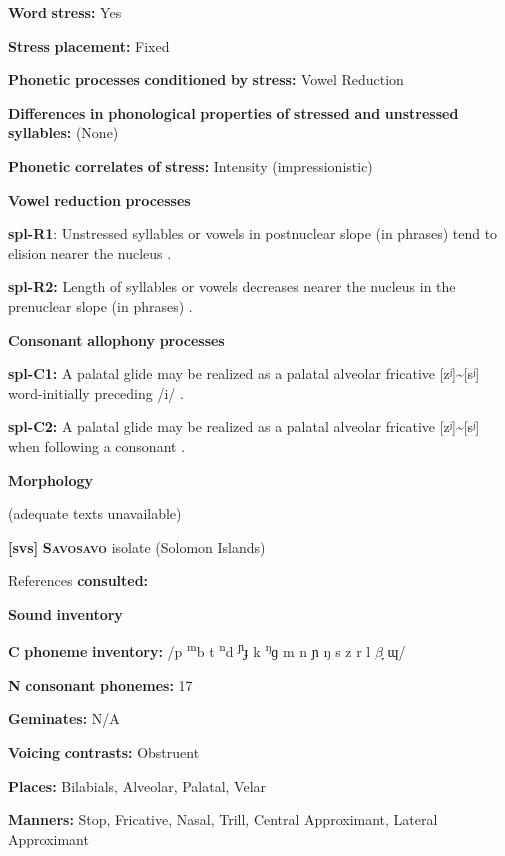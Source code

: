 \textbf{Word} \textbf{stress:} Yes

\textbf{Stress} \textbf{placement:} Fixed

\textbf{Phonetic} \textbf{processes} \textbf{conditioned} \textbf{by} \textbf{stress:} Vowel Reduction

\textbf{Differences} \textbf{in} \textbf{phonological} \textbf{properties} \textbf{of} \textbf{stressed} \textbf{and} \textbf{unstressed} \textbf{syllables:} (None)

\textbf{Phonetic} \textbf{correlates} \textbf{of} \textbf{stress:} Intensity (impressionistic)

\textbf{Vowel} \textbf{reduction} \textbf{processes}

\textbf{spl-R1}: Unstressed syllables or vowels in postnuclear slope (in phrases) tend to elision nearer the nucleus \citep[6]{McElhanon1970}.

\textbf{spl-R2:} Length of syllables or vowels decreases nearer the nucleus in the prenuclear slope (in phrases) \citep[6]{McElhanon1970}.

\textbf{Consonant} \textbf{allophony} \textbf{processes}

\textbf{spl-C1:} A palatal glide may be realized as a palatal alveolar fricative [zʲ]{\textasciitilde}[sʲ] word-initially preceding /i/ \citep{McElhanon1970}.

\textbf{spl-C2:} A palatal glide may be realized as a palatal alveolar fricative [zʲ]{\textasciitilde}[sʲ] when following a consonant \citep{McElhanon1970}.

\textbf{Morphology}

(adequate texts unavailable)

\textbf{[svs]}   \textbf{\textsc{Savosavo}}  isolate (Solomon Islands)

References \textbf{consulted:} \citet{Wegener2008}

\textbf{Sound} \textbf{inventory}

\textbf{C} \textbf{phoneme} \textbf{inventory:} /p \textsuperscript{m}b t \textsuperscript{n}d \textsuperscript{ɲ}ɟ k \textsuperscript{ŋ}ɡ m n ɲ ŋ s z r l $\beta ̞$ ɰ/

\textbf{N} \textbf{consonant} \textbf{phonemes:} 17

\textbf{Geminates:} N/A

\textbf{Voicing} \textbf{contrasts:} Obstruent

\textbf{Places:} Bilabials, Alveolar, Palatal, Velar

\textbf{Manners:} Stop, Fricative, Nasal, Trill, Central Approximant, Lateral Approximant

